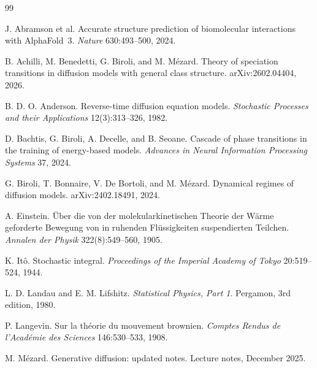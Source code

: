 \documentclass[11pt,a4paper]{article}
\begin{document}
\begingroup
\small
\begin{thebibliography}{99}
\setlength{\itemsep}{0.2em}

J. Abramson et al.
\newblock Accurate structure prediction of biomolecular interactions with AlphaFold~3.
\newblock \emph{Nature} 630:493--500, 2024.

B. Achilli, M. Benedetti, G. Biroli, and M. M\'ezard.
\newblock Theory of speciation transitions in diffusion models with general class structure.
\newblock arXiv:2602.04404, 2026.

B. D. O. Anderson.
\newblock Reverse-time diffusion equation models.
\newblock \emph{Stochastic Processes and their Applications} 12(3):313--326, 1982.

D. Bachtis, G. Biroli, A. Decelle, and B. Seoane.
\newblock Cascade of phase transitions in the training of energy-based models.
\newblock \emph{Advances in Neural Information Processing Systems} 37, 2024.

G. Biroli, T. Bonnaire, V. De Bortoli, and M. M\'ezard.
\newblock Dynamical regimes of diffusion models.
\newblock arXiv:2402.18491, 2024.

A. Einstein.
\newblock \"Uber die von der molekularkinetischen Theorie der W\"arme geforderte Bewegung von
in ruhenden Fl\"ussigkeiten suspendierten Teilchen.
\newblock \emph{Annalen der Physik} 322(8):549--560, 1905.

K. It\^o.
\newblock Stochastic integral.
\newblock \emph{Proceedings of the Imperial Academy of Tokyo} 20:519--524, 1944.

L. D. Landau and E. M. Lifshitz.
\newblock \emph{Statistical Physics, Part 1}.
\newblock Pergamon, 3rd edition, 1980.

P. Langevin.
\newblock Sur la th\'eorie du mouvement brownien.
\newblock \emph{Comptes Rendus de l'Acad\'emie des Sciences} 146:530--533, 1908.

M. M\'ezard.
\newblock Generative diffusion: updated notes.
\newblock Lecture notes, December 2025.


\end{thebibliography}
\end{document}
